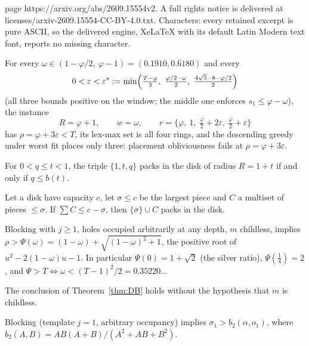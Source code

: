\documentclass[10pt,a4paper]{amsart}
\begin{document}
page https://arxiv.org/abs/2609.15554v2. A full rights notice is delivered at licenses/arxiv-2609.15554-CC-BY-4.0.txt. Characters: every retained excerpt is pure ASCII, so the delivered engine, XeLaTeX with its default Latin Modern text font, reports no missing character.
\begin{theorem}
\label{thm:golden}
For every $\omega\in(1-\varphi/2,\ \varphi-1)=(0.1910,0.6180)$ and every
\[
0<\varepsilon<\varepsilon^\ast:=
\min\Bigl(\tfrac{T-\varphi}{3},\ \tfrac{\varphi/2-\omega}{2},\
\tfrac{4\sqrt5-8-\varphi/2}{2}\Bigr)
\]
(all three bounds positive on the window; the middle one enforces
$s_1\le\varphi-\omega$), the instance
\[
R=\varphi+1,\qquad w=\omega,\qquad
r=\bigl\{\varphi,\ 1,\ \tfrac\varphi2+2\varepsilon,\
\tfrac\varphi2+\varepsilon\bigr\}
\]
has $\rho=\varphi+3\varepsilon<T$, its lex-max set is all four rings, and
the descending greedy under worst fit places only three: placement
obliviousness fails at $\rho=\varphi+3\varepsilon$.
\end{theorem}

\begin{proposition}\label{prop:S5}
For $0<q\le t<1$, the triple $\{1,t,q\}$ packs in the disk of radius
$R=1+t$ if and only if $q\le b(t)$.
\end{proposition}

\begin{lemma}\label{lem:DR}
Let a disk have capacity $c$, let $\sigma\le c$ be the largest piece and
$C$ a multiset of pieces $\le\sigma$. If $\sum C\le c-\sigma$, then
$\{\sigma\}\cup C$ packs in the disk.
\end{lemma}

\begin{theorem}\label{thm:DB}
Blocking with $j\ge1$, holes occupied arbitrarily at any depth, $m$
childless, implies
$\rho>\Psi(\omega)=(1-\omega)+\sqrt{(1-\omega)^2+1}$, the positive root of
$u^2-2(1-\omega)u-1$. In particular $\Psi(0)=1+\sqrt2$ (the silver ratio),
$\Psi(\tfrac14)=2$, and $\Psi>T\iff\omega<(T-1)^2/2=0.35220\dots$
\end{theorem}

\begin{theorem}\label{thm:DBpp}
The conclusion of Theorem~\ref{thm:DB} holds without the hypothesis that
$m$ is childless.
\end{theorem}

\begin{lemma}\label{lem:DG}
Blocking (template $j=1$, arbitrary occupancy) implies
$\sigma_1>b_2(\alpha,o_1)$, where
$b_2(A,B)=AB(A+B)/(A^2+AB+B^2)$.
\end{lemma}
\end{document}
